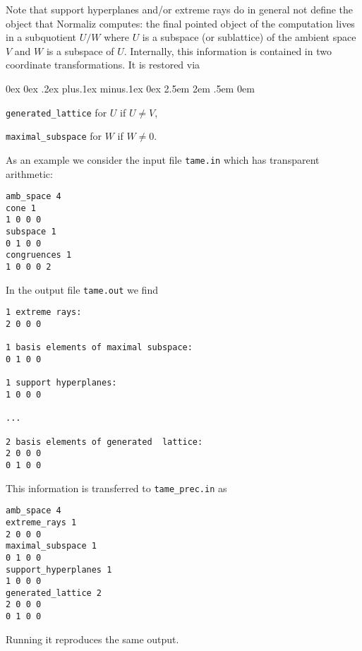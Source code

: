 \documentclass[12pt,a4paper]{scrartcl}
\newcounter{listi}
\newcommand{\stdli}{ \topsep0ex \partopsep0ex %
\parsep.2ex plus.1ex minus.1ex \itemsep0ex%
\leftmargin2.5em \labelwidth2em \labelsep.5em \rightmargin0em}%
\newenvironment{arab}{\begin{list}{\textup{(\arabic{listi})}}%
	{\usecounter{listi}\stdli}}{\end{list}}
\theoremstyle{definition}
\begin{document}
Note that support hyperplanes and/or extreme rays do in general not define the object that Normaliz computes: the final pointed object of the computation lives in a subquotient $U/W$ where $U$ is a subspace (or sublattice) of the ambient space $V$ and $W$ is a subspace of $U$. Internally, this information is contained in two coordinate transformations. It is restored via
\begin{arab}
	\item \verb|generated_lattice| for $U$ if $U\neq V$,
	\item \verb|maximal_subspace| for $W$ if $W\neq 0$.
\end{arab}

As an example we consider the input file \verb|tame.in| which has transparent arithmetic:
\begin{Verbatim}
amb_space 4
cone 1
1 0 0 0
subspace 1
0 1 0 0
congruences 1
1 0 0 0 2
\end{Verbatim}
In the output file \verb|tame.out| we find
\begin{Verbatim}
1 extreme rays:
2 0 0 0

1 basis elements of maximal subspace:
0 1 0 0

1 support hyperplanes:
1 0 0 0

...

2 basis elements of generated  lattice:
2 0 0 0
0 1 0 0
\end{Verbatim}
This information is transferred to \verb|tame_prec.in| as
\begin{Verbatim}
amb_space 4
extreme_rays 1
2 0 0 0
maximal_subspace 1
0 1 0 0
support_hyperplanes 1
1 0 0 0
generated_lattice 2
2 0 0 0
0 1 0 0
\end{Verbatim}
Running it reproduces the same output.
\end{document}
